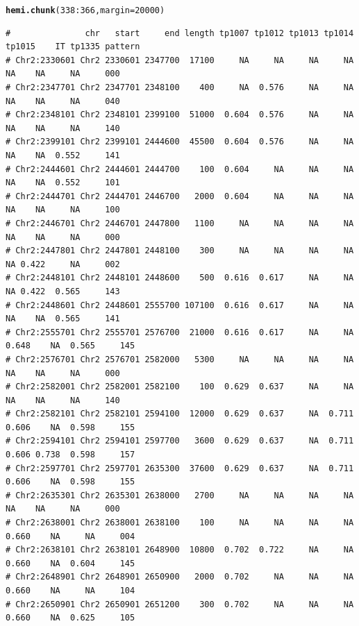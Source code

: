 \documentclass{article}\usepackage[]{graphicx}\usepackage[]{color}
\makeatletter
\newcommand{\hlnum}[1]{\textcolor[rgb]{0.686,0.059,0.569}{#1}}%
\newcommand{\hlopt}[1]{\textcolor[rgb]{0,0,0}{#1}}%
\newcommand{\hlstd}[1]{\textcolor[rgb]{0.345,0.345,0.345}{#1}}%
\newcommand{\hlkwc}[1]{\textcolor[rgb]{0.333,0.667,0.333}{#1}}%
\newcommand{\hlkwd}[1]{\textcolor[rgb]{0.737,0.353,0.396}{\textbf{#1}}}%
\newenvironment{kframe}{%
 \def\at@end@of@kframe{}%
 \ifinner\ifhmode%
  \def\at@end@of@kframe{\end{minipage}}%
  \begin{minipage}{\columnwidth}%
 \fi\fi%
 \def\FrameCommand##1{\hskip\@totalleftmargin \hskip-\fboxsep
 \colorbox{shadecolor}{##1}\hskip-\fboxsep
     \hskip-\linewidth \hskip-\@totalleftmargin \hskip\columnwidth}%
 \MakeFramed {\advance\hsize-\width
   \@totalleftmargin\z@ \linewidth\hsize
   \@setminipage}}%
 {\par\unskip\endMakeFramed%
 \at@end@of@kframe}
\newenvironment{knitrout}{}{} %
\makeatother
\begin{document}
\begin{knitrout}\footnotesize
{}\color{fgcolor}\begin{kframe}
\begin{alltt}
\hlkwd{hemi.chunk}\hlstd{(}\hlnum{338}\hlopt{:}\hlnum{366}\hlstd{,}\hlkwc{margin}\hlstd{=}\hlnum{20000}\hlstd{)}
\end{alltt}
\begin{verbatim}
#               chr   start     end length tp1007 tp1012 tp1013 tp1014 tp1015    IT tp1335 pattern
# Chr2:2330601 Chr2 2330601 2347700  17100     NA     NA     NA     NA     NA    NA     NA     000
# Chr2:2347701 Chr2 2347701 2348100    400     NA  0.576     NA     NA     NA    NA     NA     040
# Chr2:2348101 Chr2 2348101 2399100  51000  0.604  0.576     NA     NA     NA    NA     NA     140
# Chr2:2399101 Chr2 2399101 2444600  45500  0.604  0.576     NA     NA     NA    NA  0.552     141
# Chr2:2444601 Chr2 2444601 2444700    100  0.604     NA     NA     NA     NA    NA  0.552     101
# Chr2:2444701 Chr2 2444701 2446700   2000  0.604     NA     NA     NA     NA    NA     NA     100
# Chr2:2446701 Chr2 2446701 2447800   1100     NA     NA     NA     NA     NA    NA     NA     000
# Chr2:2447801 Chr2 2447801 2448100    300     NA     NA     NA     NA     NA 0.422     NA     002
# Chr2:2448101 Chr2 2448101 2448600    500  0.616  0.617     NA     NA     NA 0.422  0.565     143
# Chr2:2448601 Chr2 2448601 2555700 107100  0.616  0.617     NA     NA     NA    NA  0.565     141
# Chr2:2555701 Chr2 2555701 2576700  21000  0.616  0.617     NA     NA  0.648    NA  0.565     145
# Chr2:2576701 Chr2 2576701 2582000   5300     NA     NA     NA     NA     NA    NA     NA     000
# Chr2:2582001 Chr2 2582001 2582100    100  0.629  0.637     NA     NA     NA    NA     NA     140
# Chr2:2582101 Chr2 2582101 2594100  12000  0.629  0.637     NA  0.711  0.606    NA  0.598     155
# Chr2:2594101 Chr2 2594101 2597700   3600  0.629  0.637     NA  0.711  0.606 0.738  0.598     157
# Chr2:2597701 Chr2 2597701 2635300  37600  0.629  0.637     NA  0.711  0.606    NA  0.598     155
# Chr2:2635301 Chr2 2635301 2638000   2700     NA     NA     NA     NA     NA    NA     NA     000
# Chr2:2638001 Chr2 2638001 2638100    100     NA     NA     NA     NA  0.660    NA     NA     004
# Chr2:2638101 Chr2 2638101 2648900  10800  0.702  0.722     NA     NA  0.660    NA  0.604     145
# Chr2:2648901 Chr2 2648901 2650900   2000  0.702     NA     NA     NA  0.660    NA     NA     104
# Chr2:2650901 Chr2 2650901 2651200    300  0.702     NA     NA     NA  0.660    NA  0.625     105

\end{verbatim}
\end{kframe}
\end{knitrout}
\end{document}
